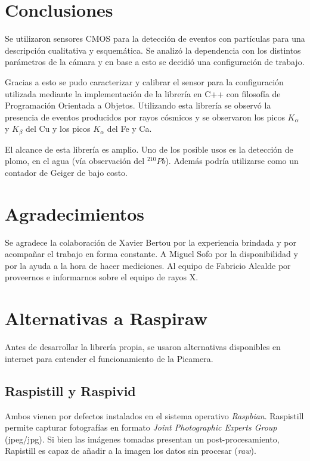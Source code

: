 \documentclass[twoside,twocolumn]{article}
\begin{document}

  \section{Conclusiones}
    Se utilizaron sensores CMOS para la detección de eventos con partículas para una descripción cualitativa y esquemática.
    Se analizó la dependencia con los distintos parámetros de la cámara y en base a esto se decidió una configuración de trabajo.

    Gracias a esto se pudo caracterizar y calibrar el sensor para la configuración utilizada mediante la implementación de la librería
    en C++ con filosofía de Programación Orientada a Objetos.
    Utilizando esta librería se observó la presencia de eventos producidos por rayos cósmicos y
    se observaron los picos $K_{\alpha}$ y $K_{\beta}$ del Cu y los picos $K_{\alpha}$ del Fe y Ca.

    El alcance de esta librería es amplio. Uno de los posible usos es la detección de plomo,
    en el agua (vía observación del $^{210}Pb$).
    Además podría utilizarse como un contador de Geiger de bajo costo.

  
  

  \section*{Agradecimientos}
    Se agradece la colaboración de Xavier Bertou por la experiencia brindada y por
    acompañar el trabajo en forma constante.
    A Miguel Sofo por la disponibilidad y por la ayuda a la hora de hacer mediciones.
    Al equipo de Fabricio Alcalde por proveernos e informarnos sobre el equipo de rayos X.

  \clearpage
  \appendix
  \section{Alternativas a Raspiraw}\label{sec:ap_alternatives}
  Antes de desarrollar la librería propia, se usaron alternativas disponibles en internet
  para entender el funcionamiento de la Picamera.
  \subsection*{Raspistill y Raspivid}
    Ambos vienen por defectos instalados en el sistema operativo \emph{Raspbian}.
    Raspistill permite capturar fotografías en formato \emph{Joint Photographic Experts Group} (jpeg/jpg).
    Si bien las imágenes tomadas presentan un post-procesamiento, Rapistill es capaz de añadir a la imagen los datos sin procesar (\emph{raw}).
\end{document}
